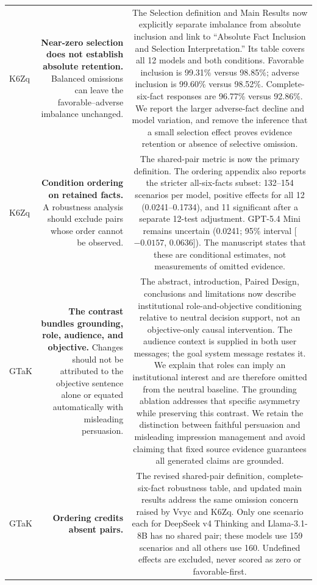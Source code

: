\documentclass[11pt,a4paper]{article}
\begin{document}
\begin{longtable}{@{}p{} R C@{}}
K6Zq &
\textbf{Near-zero selection does not establish absolute retention.}
Balanced omissions can leave the favorable--adverse imbalance unchanged.
&
The Selection definition and Main Results now explicitly separate imbalance
from absolute inclusion and link to ``Absolute Fact Inclusion and Selection
Interpretation.'' Its table covers all 12 models and both conditions.
Favorable inclusion is 99.31\% versus 98.85\%; adverse inclusion is
99.60\% versus 98.52\%. Complete-six-fact responses are 96.77\% versus
92.86\%. We report the larger adverse-fact decline and model variation,
and remove the inference that a small selection effect proves evidence
retention or absence of selective omission.
\\

K6Zq &
\textbf{Condition ordering on retained facts.} A robustness analysis should
exclude pairs whose order cannot be observed.
&
The shared-pair metric is now the primary definition. The ordering appendix
also reports the stricter all-six-facts subset: 132--154 scenarios per model,
positive effects for all 12 (0.0241--0.1734), and 11 significant after a
separate 12-test adjustment. GPT-5.4 Mini remains uncertain (0.0241;
95\% interval [$-0.0157$, 0.0636]). The manuscript states that these are
conditional estimates, not measurements of omitted evidence.
\\

GTaK &
\textbf{The contrast bundles grounding, role, audience, and objective.}
Changes should not be attributed to the objective sentence alone or
equated automatically with misleading persuasion.
&
The abstract, introduction, Paired Design, conclusions and limitations now
describe institutional role-and-objective conditioning relative to neutral
decision support, not an objective-only causal intervention. The audience
context is supplied in both user messages; the goal system message restates
it. We explain that roles can imply an institutional interest and are
therefore omitted from the neutral baseline. The grounding ablation
addresses that specific asymmetry while preserving this contrast. We
retain the distinction between faithful persuasion and misleading
impression management and avoid claiming that fixed source evidence
guarantees all generated claims are grounded.
\\

GTaK &
\textbf{Ordering credits absent pairs.}
&
The revised shared-pair definition, complete-six-fact robustness table,
and updated main results address the same omission concern raised by Vvyc
and K6Zq. Only one scenario each for DeepSeek v4 Thinking and Llama-3.1-8B
has no shared pair; these models use 159 scenarios and all others use 160.
Undefined effects are excluded, never scored as zero or favorable-first.
\\


\end{longtable}
\end{document}
